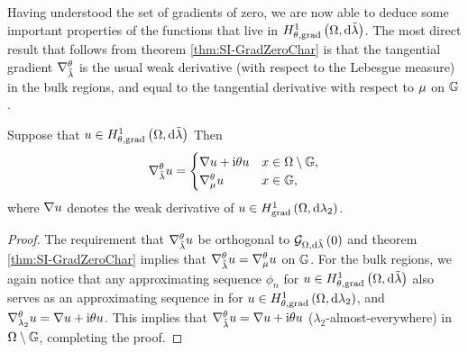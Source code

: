 Having understood the set of gradients of zero, we are now able to deduce some important properties of the functions that live in $H^1_{\theta, \mathrm{grad}}\left( \Omega, \mathrm{d}\tilde{\lambda} \right)$.
The most direct result that follows from theorem \ref{thm:SI-GradZeroChar} is that the tangential gradient $\nabla^{\theta}_{\tilde{\lambda}}$ is the usual weak derivative (with respect to the Lebesgue measure) in the bulk regions, and equal to the tangential derivative with respect to $\mu$ on $\mathbb{G}$.
\begin{cory}
	Suppose that $u\in H^1_{\theta, \mathrm{grad}}\left( \Omega, \mathrm{d}\tilde{\lambda} \right)$
	Then 
	\begin{align*}
		\nabla^{\theta}_{\tilde{\lambda}}u = \begin{cases} \nabla u + \mathrm{i}\theta u & x\in\Omega\setminus\mathbb{G}, \\ \nabla^{\theta}_{\mu}u & x\in\mathbb{G}, \end{cases}
	\end{align*}
	where $\nabla u$ denotes the weak derivative of $u\in H^1_\mathrm{grad}\left( \Omega, \mathrm{d}\lambda_2 \right)$.
\end{cory}
\begin{proof}
	The requirement that $\nabla^{\theta}_{\tilde{\lambda}}u$ be orthogonal to $\mathcal{G}_{ \Omega, \mathrm{d}\tilde{\lambda}}\left( 0 \right)$ and theorem \ref{thm:SI-GradZeroChar} implies that $\nabla^{\theta}_{\tilde{\lambda}}u = \nabla^{\theta}_{\mu}u$ on $\mathbb{G}$.
	For the bulk regions, we again notice that any approximating sequence $\phi_n$ for $u\in H^1_{\theta, \mathrm{grad}}\left( \Omega, \mathrm{d}\tilde{\lambda} \right)$ also serves as an approximating sequence in for $u\in H^1_{\theta, \mathrm{grad}}\left( \Omega, \mathrm{d}\lambda_2 \right)$, and $\nabla^{\theta}_{\lambda_2}u = \nabla u + \mathrm{i}\theta u$.
	This implies that $\nabla^{\theta}_{\tilde{\lambda}}u = \nabla u + \mathrm{i}\theta u$ ($\lambda_2$-almost-everywhere) in $\Omega\setminus\mathbb{G}$, completing the proof.
\end{proof}

